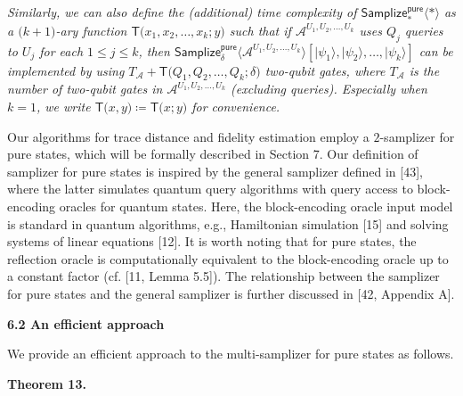 \emph{Similarly, we can also define the (additional) time complexity of $\mathsf{Samplize}^{\mathsf{pure}}_{*}\langle*\rangle$ as a $\lparen k+1\rparen$-ary function $\mathsf{T}\lparen x_{1},x_{2},\dots,x_{k};y\rparen$ such that if $\mathcal{A}^{U_{1},U_{2},\dots,U_{k}}$ uses $Q_{j}$ queries to $U_{j}$ for each $1\leq j\leq k$, then $\mathsf{Samplize}^{\mathsf{pure}}_{\delta}\langle\mathcal{A}^{U_{1},U_{2},\dots,U_{k}}\rangle[\lvert\psi_{1}\rangle,\lvert\psi_{2}\rangle,\dots,\lvert\psi_{k}\rangle]$ can be implemented by using $T_{\mathcal{A}}+\mathsf{T}\lparen Q_{1},Q_{2},\dots,Q_{k};\delta\rparen$ two-qubit gates, where $T_{\mathcal{A}}$ is the number of two-qubit gates in $\mathcal{A}^{U_{1},U_{2},\dots,U_{k}}$ (excluding queries).
Especially when $k=1$, we write $\mathsf{T}\lparen x,y\rparen\coloneqq\mathsf{T}\lparen x;y\rparen$ for convenience.}\par






Our algorithms for trace distance and fidelity estimation employ a $2$-samplizer for pure states, which will be formally described in Section 7.
Our definition of samplizer for pure states is inspired by the general samplizer defined in [43], where the latter simulates quantum query algorithms with query access to block-encoding oracles for quantum states.
Here, the block-encoding oracle input model is standard in quantum algorithms, e.g., Hamiltonian simulation [15] and solving systems of linear equations [12].
It is worth noting that for pure states, the reflection oracle is computationally equivalent to the block-encoding oracle up to a constant factor (cf. [11, Lemma 5.5]).
The relationship between the samplizer for pure states and the general samplizer is further discussed in [42, Appendix A].\par





\par\medskip\noindent\textbf{
6.2 An efficient approach}\par




We provide an efficient approach to the multi-samplizer for pure states as follows.\par





\par\medskip\noindent\textbf{
\textbf{Theorem 13}\textbf{.}
}\par




